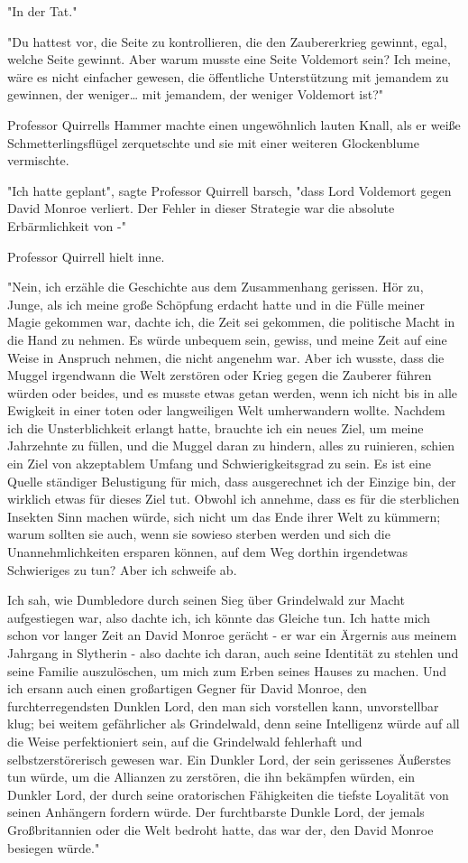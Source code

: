 {"In der Tat."

"Du hattest vor, die Seite zu kontrollieren, die den Zaubererkrieg gewinnt, egal, welche Seite gewinnt. Aber warum musste eine Seite Voldemort sein? Ich meine, wäre es nicht einfacher gewesen, die öffentliche Unterstützung mit jemandem zu gewinnen, der weniger… mit jemandem, der weniger Voldemort ist?"

Professor Quirrells Hammer machte einen ungewöhnlich lauten Knall, als er weiße Schmetterlingsflügel zerquetschte und sie mit einer weiteren Glockenblume vermischte.

"Ich hatte geplant", sagte Professor Quirrell barsch, "dass Lord Voldemort gegen David Monroe verliert. Der Fehler in dieser Strategie war die absolute Erbärmlichkeit von -"

Professor Quirrell hielt inne.

"Nein, ich erzähle die Geschichte aus dem Zusammenhang gerissen. Hör zu, Junge, als ich meine große Schöpfung erdacht hatte und in die Fülle meiner Magie gekommen war, dachte ich, die Zeit sei gekommen, die politische Macht in die Hand zu nehmen. Es würde unbequem sein, gewiss, und meine Zeit auf eine Weise in Anspruch nehmen, die nicht angenehm war. Aber ich wusste, dass die Muggel irgendwann die Welt zerstören oder Krieg gegen die Zauberer führen würden oder beides, und es musste etwas getan werden, wenn ich nicht bis in alle Ewigkeit in einer toten oder langweiligen Welt umherwandern wollte. Nachdem ich die Unsterblichkeit erlangt hatte, brauchte ich ein neues Ziel, um meine Jahrzehnte zu füllen, und die Muggel daran zu hindern, alles zu ruinieren, schien ein Ziel von akzeptablem Umfang und Schwierigkeitsgrad zu sein. Es ist eine Quelle ständiger Belustigung für mich, dass ausgerechnet ich der Einzige bin, der wirklich etwas für dieses Ziel tut. Obwohl ich annehme, dass es für die sterblichen Insekten Sinn machen würde, sich nicht um das Ende ihrer Welt zu kümmern; warum sollten sie auch, wenn sie sowieso sterben werden und sich die Unannehmlichkeiten ersparen können, auf dem Weg dorthin irgendetwas Schwieriges zu tun? Aber ich schweife ab.

Ich sah, wie Dumbledore durch seinen Sieg über Grindelwald zur Macht aufgestiegen war, also dachte ich, ich könnte das Gleiche tun. Ich hatte mich schon vor langer Zeit an David Monroe gerächt - er war ein Ärgernis aus meinem Jahrgang in Slytherin - also dachte ich daran, auch seine Identität zu stehlen und seine Familie auszulöschen, um mich zum Erben seines Hauses zu machen. Und ich ersann auch einen großartigen Gegner für David Monroe, den furchterregendsten Dunklen Lord, den man sich vorstellen kann, unvorstellbar klug; bei weitem gefährlicher als Grindelwald, denn seine Intelligenz würde auf all die Weise perfektioniert sein, auf die Grindelwald fehlerhaft und selbstzerstörerisch gewesen war. Ein Dunkler Lord, der sein gerissenes Äußerstes tun würde, um die Allianzen zu zerstören, die ihn bekämpfen würden, ein Dunkler Lord, der durch seine oratorischen Fähigkeiten die tiefste Loyalität von seinen Anhängern fordern würde. Der furchtbarste Dunkle Lord, der jemals Großbritannien oder die Welt bedroht hatte, das war der, den David Monroe besiegen würde."

}
